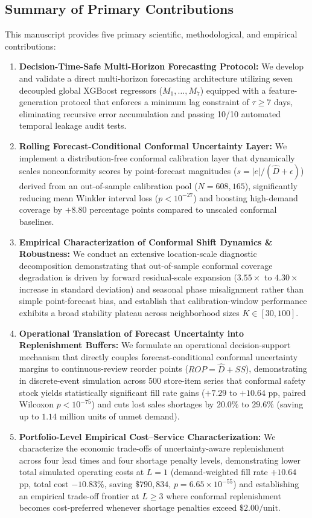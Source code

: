 \documentclass[11pt,a4paper]{article}
\begin{document}
\subsection{Summary of Primary Contributions}
\label{sec:intro_contributions}
This manuscript provides five primary scientific, methodological, and empirical contributions:
\begin{enumerate}
    \item \textbf{Decision-Time-Safe Multi-Horizon Forecasting Protocol:} We develop and validate a direct multi-horizon forecasting architecture utilizing seven decoupled global XGBoost regressors ($M_1,\dots,M_7$) equipped with a feature-generation protocol that enforces a minimum lag constraint of $\tau \ge 7$ days, eliminating recursive error accumulation and passing 10/10 automated temporal leakage audit tests.
    \item \textbf{Rolling Forecast-Conditional Conformal Uncertainty Layer:} We implement a distribution-free conformal calibration layer that dynamically scales nonconformity scores by point-forecast magnitudes ($s = |e| / (\hat{D} + \epsilon)$) derived from an out-of-sample calibration pool ($N=608,165$), significantly reducing mean Winkler interval loss ($p < 10^{-27}$) and boosting high-demand coverage by $+8.80$ percentage points compared to unscaled conformal baselines.
    \item \textbf{Empirical Characterization of Conformal Shift Dynamics \& Robustness:} We conduct an extensive location-scale diagnostic decomposition demonstrating that out-of-sample conformal coverage degradation is driven by forward residual-scale expansion ($3.55\times$ to $4.30\times$ increase in standard deviation) and seasonal phase misalignment rather than simple point-forecast bias, and establish that calibration-window performance exhibits a broad stability plateau across neighborhood sizes $K \in [30, 100]$.
    \item \textbf{Operational Translation of Forecast Uncertainty into Replenishment Buffers:} We formulate an operational decision-support mechanism that directly couples forecast-conditional conformal uncertainty margins to continuous-review reorder points ($ROP = \hat{D} + SS$), demonstrating in discrete-event simulation across 500 store-item series that conformal safety stock yields statistically significant fill rate gains ($+7.29$ to $+10.64$ pp, paired Wilcoxon $p < 10^{-75}$) and cuts lost sales shortages by $20.0\%$ to $29.6\%$ (saving up to $1.14$ million units of unmet demand).
    \item \textbf{Portfolio-Level Empirical Cost--Service Characterization:} We characterize the economic trade-offs of uncertainty-aware replenishment across four lead times and four shortage penalty levels, demonstrating lower total simulated operating costs at $L=1$ (demand-weighted fill rate $+10.64$ pp, total cost $-10.83\%$, saving $\$790,834$, $p = 6.65 \times 10^{-55}$) and establishing an empirical trade-off frontier at $L \ge 3$ where conformal replenishment becomes cost-preferred whenever shortage penalties exceed $\$2.00/\text{unit}$.
\end{enumerate}
\end{document}
